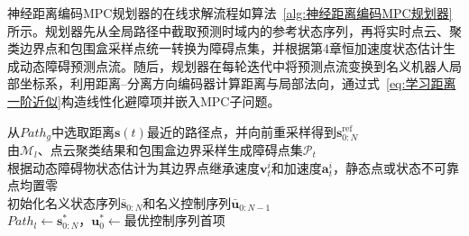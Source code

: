 神经距离编码MPC规划器的在线求解流程如算法~\ref{alg:神经距离编码MPC规划器}所示。规划器先从全局路径中截取预测时域内的参考状态序列，再将实时点云、聚类边界点和包围盒采样点统一转换为障碍点集，并根据第4章恒加速度状态估计生成动态障碍预测点流。随后，规划器在每轮迭代中将预测点流变换到名义机器人局部坐标系，利用距离--分离方向编码器计算距离与局部法向，通过式~\eqref{eq:学习距离一阶近似}构造线性化避障项并嵌入MPC子问题。

\begin{algorithm}[H]
	\SetAlgoNoEnd
	从$Path_g$中选取距离$\mathbf{s}(t)$最近的路径点，并向前重采样得到$\mathbf{s}_{0:N}^{\mathrm{ref}}$\\
	由$\mathcal{M}_l$、点云聚类结果和包围盒边界采样生成障碍点集$\mathcal{P}_t$\\
	根据动态障碍物状态估计为其边界点继承速度$\mathbf{v}_{t}^{i}$和加速度$\mathbf{a}_{t}^{i}$，静态点或状态不可靠点均置零\\
	初始化名义状态序列$\bar{\mathbf{s}}_{0:N}$和名义控制序列$\bar{\mathbf{u}}_{0:N-1}$\\
	$Path_l\gets\mathbf{s}_{0:N}^{*}$，$\mathbf{u}_{0}^{*}\gets$最优控制序列首项\\
	\caption{神经距离编码MPC规划器}
	\label{alg:神经距离编码MPC规划器}
\end{algorithm}

